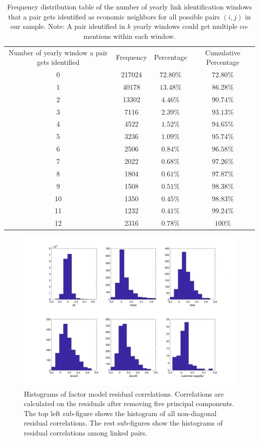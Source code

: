 \begin{table}[H]
    \centering
  \begin{tabular}{cccc}
  \hline
  Number of yearly window a pair gets identified& Frequency & Percentage& Cumulative Percentage\\
0   & 217024&      $72.80\%$ & $72.80\%$\\ 
1 &          40178   &   $13.48\%$ & $86.28\%$ \\ 
2     &      13302 &     $4.46\%$ & $90.74\%$\\ 
3         &  7116    &  $2.39\%$ & $93.13\%$\\ 
4      &     4522   &   $1.52\%$ & $94.65\%$\\ 
5        &   3236     & $1.09\%$ & $95.74\%$\\ 
6       &    2506    &$0.84\%$ & $96.58\%$\\ 
7        &   2022    & $0.68\%$ & $97.26\%$\\ 
8         &  1804   &  $0.61\%$ & $97.87\%$\\ 
9          & 1508   &  $0.51\%$ & $98.38\%$\\ 
10          & 1350    & $0.45\%$ & $98.83\%$\\ 
11           &1232     &$0.41\%$ & $99.24\%$\\ 
12           &2316     & $0.78\%$& $100\%$\\ 
\hline
\end{tabular}
\caption{Frequency distribution table of the number of yearly link identification windows that a pair gets identified as economic neighbors for all possible pairs $(i,j)$ in our sample. Note: A pair identified in $k$ yearly windows could get multiple co-mentions within each window. }
\label{table:freq}
\end{table}


\begin{figure}[H]
    \centering
    \includegraphics[scale=0.25]{pic/corr_5pca.jpg}
    \caption{Histograms of factor model residual correlations. Correlations are calculated on the residuals after removing five principal components. The top left sub-figure shows the histogram of all non-diagonal residual correlations. The rest sub-figures show the histograms of residual correlations among linked pairs.}
    \label{fig:corr5_pca}
\end{figure}


